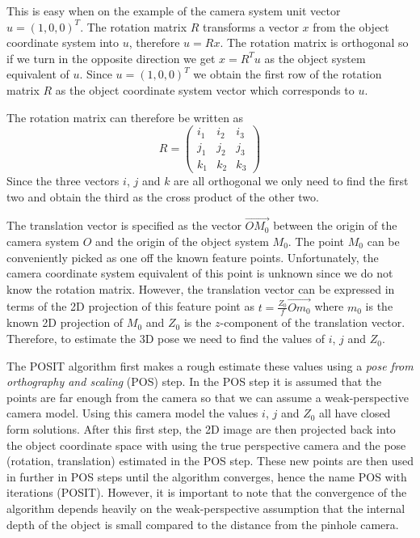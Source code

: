 \documentclass[11pt,a4paper,twoside]{report}
\begin{document}
This is easy when on the
example of the camera system unit vector $u = (1,0,0)^T$. The rotation matrix
$R$ transforms a vector $x$ from the object coordinate system into $u$,
therefore $u = Rx$. The rotation matrix is orthogonal so if we turn in the
opposite direction we get $x = R^Tu$ as the object system equivalent of $u$. Since $u = (1,0,0)^T$ we obtain the first
row of the rotation matrix $R$ as the object coordinate system vector which
corresponds to $u$.

The rotation matrix can therefore be written as
\begin{equation}
R = \begin{pmatrix}i_1&i_2&i_3\\j_1&j_2&j_3\\k_1&k_2&k_3\end{pmatrix}
\end{equation}
Since the three vectors $i$, $j$ and $k$ are all orthogonal we only need to find the
first two and obtain the third as the cross product of the other two.

The translation vector is specified as the vector $\overrightarrow{OM_0}$ between the
origin of the camera system $O$ and the origin of the object system $M_0$. The
point $M_0$ can be conveniently picked as one off the known feature
points. Unfortunately, the
camera coordinate system equivalent of this point is unknown since we do not
know the rotation matrix. However, the translation vector can be expressed in
terms of the 2D projection of this feature point
as $t = \frac{Z_0}{f}\overrightarrow{Om_0}$ where $m_0$ is the known 2D projection of $M_0$
and $Z_0$ is the $z$-component of the translation vector. Therefore, to estimate
the 3D pose we need to find the values of $i$, $j$ and $Z_0$.

The POSIT algorithm first makes a rough estimate these values using a \textit{pose from
  orthography and scaling} (POS) step. In the POS step it is assumed that the
points are far enough from the camera so that we can assume a weak-perspective
camera model. Using this camera model the values $i$, $j$ and $Z_0$ all have
closed form solutions. After this first step, the 2D image are then projected back into the object
coordinate space with using the true perspective camera and the pose (rotation,
translation) estimated in the POS step. These new points are then used in further
in POS steps until the algorithm converges, hence the name POS with iterations
(POSIT). However, it is important to note that the convergence of the algorithm
depends heavily on the weak-perspective assumption that the internal depth of
the object is small compared to the distance from the pinhole camera.
\end{document}
